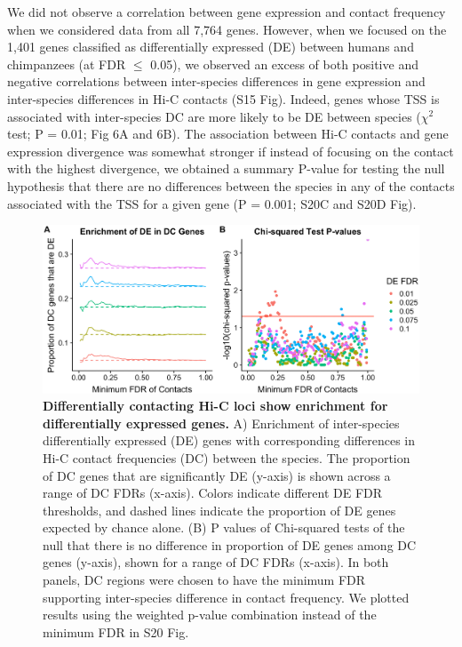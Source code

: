 We did not observe a correlation between gene expression and contact frequency when we considered data from all 7,764 genes. However, when we focused on the 1,401 genes classified as differentially expressed (DE) between humans and chimpanzees (at FDR ${\leq}$ 0.05), we observed an excess of both positive and negative correlations between inter-species differences in gene expression and inter-species differences in Hi-C contacts (S15 Fig). Indeed, genes whose TSS is associated with inter-species DC are more likely to be DE between species ($\chi^2$ test; P = 0.01; Fig 6A and 6B). The association between Hi-C contacts and gene expression divergence was somewhat stronger if instead of focusing on the contact with the highest divergence, we obtained a summary P-value \cite{Whitlock.2005} for testing the null hypothesis that there are no differences between the species in any of the contacts associated with the TSS for a given gene (P = 0.001; S20C and S20D Fig).

\begin{figure}
\centering
\includegraphics[width=6in]{img/fig6.PNG}
\caption[Differentially contacting Hi-C loci show enrichment for differentially expressed genes.]{\textbf{Differentially contacting Hi-C loci show enrichment for differentially expressed genes.} A) Enrichment of inter-species differentially expressed (DE) genes with corresponding differences in Hi-C contact frequencies (DC) between the species. The proportion of DC genes that are significantly DE (y-axis) is shown across a range of DC FDRs (x-axis). Colors indicate different DE FDR thresholds, and dashed lines indicate the proportion of DE genes expected by chance alone. (B) P values of Chi-squared tests of the null that there is no difference in proportion of DE genes among DC genes (y-axis), shown for a range of DC FDRs (x-axis). In both panels, DC regions were chosen to have the minimum FDR supporting inter-species difference in contact frequency. We plotted results using the weighted p-value combination instead of the minimum FDR in S20 Fig.}
\label{fig:ch02-fig6}
\end{figure}


